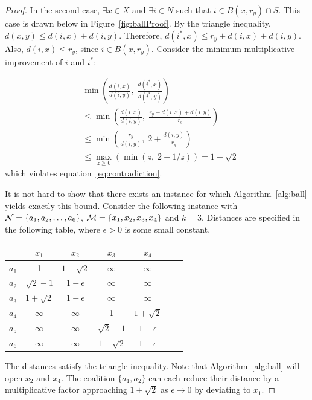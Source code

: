 \begin{proof}
In the second case, $\exists x \in X$ and $\exists i \in N$ such that $i \in B(x, r_y) \cap S$. This case is drawn below in Figure~\ref{fig:ballProof}. By the triangle inequality, $d(x, y) \leq d(i, x) + d(i, y)$. Therefore, $d(i^*, x) \leq r_y + d(i, x) + d(i, y)$. Also, $d(i, x) \leq r_y$, since $i \in B(x, r_y)$. Consider the minimum multiplicative improvement of $i$ and $i^*$: 

 
\begin{equation*}
\begin{split}
	&\min\left( \frac{d(i, x)}{d(i, y)}, \; \frac{d(i^*, x)}{d(i^*, y)} \right) \\
	& \leq \min\left( \frac{d(i, x)}{d(i, y)}, \; \frac{r_y + d(i, x) + d(i, y)}{r_y} \right) \\
	& \leq \min\left( \frac{r_y}{d(i, y)}, \; 2 + \frac{d(i, y)}{r_y} \right) \\
	& \leq \max_{z \geq 0} \left( \min \left( z,\; 2+1/z\right) \right) = 1 + \sqrt{2} 
\end{split}
\end{equation*}
which violates equation~\ref{eq:contradiction}. 

It is not hard to show that there exists an instance for which Algorithm~\ref{alg:ball} yields exactly this bound. Consider the following instance with $\mathcal {N} = \{a_1,  a_2, \hdots, a_6\}$, $\mathcal{M} = \{x_1, x_2, x_3, x_4\}$ and $k=3$. Distances are specified in the following table, where $\epsilon > 0$ is some small constant.
\begin{center}
  \begin{tabular}{|c || c | c | c | c | c | c  |} 
  \hline 
             & $x_1$          & $x_2$       & $x_3$          & $x_4$             \\ \hline \hline
  $a_1$ & 1                  & $1+\sqrt{2}$ & $\infty$        & $\infty$         \\ \hline
  $a_2$ & $\sqrt{2}-1$ &  $1-\epsilon$ & $\infty$        & $\infty$         \\ \hline  
  $a_3$ & $1+\sqrt{2}$ &  $1-\epsilon$ & $\infty$        & $\infty$          \\ \hline
  $a_4$ & $\infty$         & $\infty$     & 1                  &   $1+\sqrt{2}$ \\ \hline
  $a_5$ & $\infty$         & $\infty$     & $\sqrt{2}-1$  &   $1-\epsilon$ \\ \hline
  $a_6$ & $\infty$         & $\infty$     & $1+\sqrt{2}$ & $1-\epsilon$  \\ \hline
\end{tabular}
\end{center}
The distances satisfy the triangle inequality. Note that Algorithm~\ref{alg:ball} will open $x_2$ and $x_4$. The coalition $\{a_1, a_2\}$ can each reduce their distance by a multiplicative factor approaching $1+\sqrt{2}$ as $\epsilon \rightarrow 0$ by deviating to $x_1$.
\end{proof}

